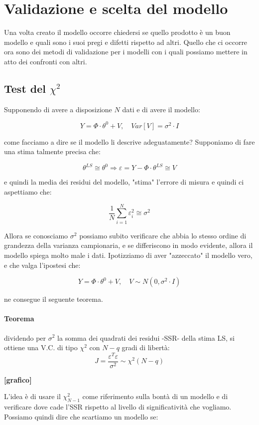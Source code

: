\section{Validazione e scelta del modello}
Una volta creato il modello occorre chiedersi se quello prodotto è un buon modello e quali sono i suoi pregi e difetti rispetto ad altri. Quello che ci occorre ora sono dei metodi di validazione per i modelli con i quali possiamo mettere in atto dei confronti con altri. 
\subsection{Test del $\chi^2$}
Supponendo di avere a disposizione $N$ dati e di avere il modello:

    \[ Y=\Phi\cdot\theta^0+V, \quad Var[V]=\sigma^2\cdot I \]

come facciamo a dire se il modello li descrive adeguatamente? Supponiamo di fare una stima talmente precisa che:

    \[ \theta^{LS}\cong\theta^0 \Longrightarrow \varepsilon =Y-\Phi\cdot\theta^{LS}\cong V \]

e quindi la media dei residui del modello, "stima" l'errore di misura e quindi ci aspettiamo che:

    \[ \frac{1}{N}\sum_{i=1}^{N}{\varepsilon_i^2}\cong\sigma^2 \]

Allora se conosciamo $\sigma^2$ possiamo subito verificare che abbia lo stesso ordine di grandezza della varianza campionaria, e se differiscono in modo evidente, allora il modello spiega molto male i dati.
Ipotizziamo di aver "azzeccato" il modello vero, e che valga l'ipostesi che:

    \[ Y=\Phi\cdot\theta^0+V,  \quad  V\sim N(0,\sigma^2\cdot I) \]

ne consegue il seguente teorema.
\paragraph{Teorema} dividendo per $\sigma^2$ la somma dei quadrati dei residui -SSR- della stima LS, si ottiene una V.C. di tipo $\chi^2$ con $N-q$ gradi di libertà:
  \[ J=\frac{\varepsilon^T\varepsilon}{\sigma^2}\sim \chi^2(N-q) \]
\begin{center}
\textbf{[grafico]}
\end{center}
L'idea è di usare il $\chi_{N-1}^2$ come riferimento sulla bontà di un modello e di verificare dove cade l'SSR rispetto al livello di significatività che vogliamo. Possiamo quindi dire che scartiamo un modello se:

